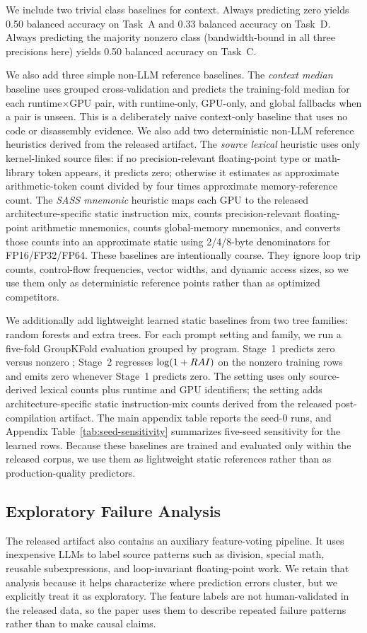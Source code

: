 We include two trivial class baselines for context.
Always predicting zero yields 0.50 balanced accuracy on Task~A and 0.33 balanced accuracy on Task~D.
Always predicting the majority nonzero class (bandwidth-bound in all three precisions here) yields 0.50 balanced accuracy on Task~C.

We also add three simple non-LLM reference baselines.
The \emph{context median} baseline uses grouped cross-validation and predicts the training-fold median \rai for each runtime$\times$GPU pair, with runtime-only, GPU-only, and global fallbacks when a pair is unseen.
This is a deliberately naive context-only baseline that uses no code or disassembly evidence.
We also add two deterministic non-LLM reference heuristics derived from the released artifact.
The \emph{source lexical} heuristic uses only kernel-linked source files:
if no precision-relevant floating-point type or math-library token appears, it predicts zero; otherwise it estimates \rai as approximate arithmetic-token count divided by four times approximate memory-reference count.
The \emph{SASS mnemonic} heuristic maps each GPU to the released architecture-specific static instruction mix, counts precision-relevant floating-point arithmetic mnemonics, counts global-memory mnemonics, and converts those counts into an approximate static \rai using 2/4/8-byte denominators for FP16/FP32/FP64.
These baselines are intentionally coarse.
They ignore loop trip counts, control-flow frequencies, vector widths, and dynamic access sizes, so we use them only as deterministic reference points rather than as optimized competitors.

We additionally add lightweight learned static baselines from two tree families: random forests and extra trees.
For each prompt setting and family, we run a five-fold GroupKFold evaluation grouped by program.
Stage~1 predicts zero versus nonzero \rai; Stage~2 regresses $\log(1+RAI)$ on the nonzero training rows and emits zero whenever Stage~1 predicts zero.
The \sourceonly setting uses only source-derived lexical counts plus runtime and GPU identifiers; the \sourcesass setting adds architecture-specific static instruction-mix counts derived from the released post-compilation artifact.
The main appendix table reports the seed-0 runs, and Appendix Table~\ref{tab:seed-sensitivity} summarizes five-seed sensitivity for the learned rows.
Because these baselines are trained and evaluated only within the released corpus, we use them as lightweight static references rather than as production-quality predictors.

\subsection{Exploratory Failure Analysis}

The released artifact also contains an auxiliary feature-voting pipeline.
It uses inexpensive LLMs to label source patterns such as division, special math, reusable subexpressions, and loop-invariant floating-point work.
We retain that analysis because it helps characterize where prediction errors cluster, but we explicitly treat it as exploratory.
The feature labels are not human-validated in the released data, so the paper uses them to describe repeated failure patterns rather than to make causal claims.
